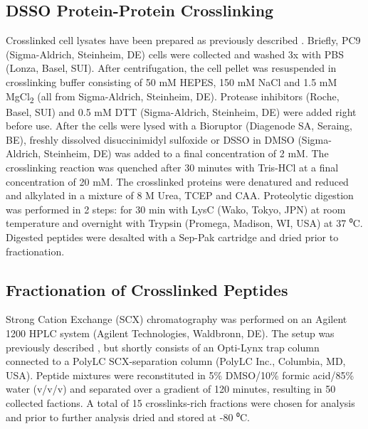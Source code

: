 \subsection{DSSO Protein-Protein Crosslinking}
Crosslinked cell lysates have been prepared as previously described \cite{klykov2018efficient}. Briefly, PC9 (Sigma-Aldrich, Steinheim, DE) cells were collected and washed 3x with PBS (Lonza, Basel, SUI). After centrifugation, the cell pellet was resuspended in crosslinking buffer consisting of 50 mM HEPES, 150 mM NaCl and 1.5 mM MgCl\textsubscript{2} (all from Sigma-Aldrich, Steinheim, DE). Protease inhibitors (Roche, Basel, SUI) and 0.5 mM DTT (Sigma-Aldrich, Steinheim, DE) were added right before use. After the cells were lysed with a Bioruptor (Diagenode SA, Seraing, BE), freshly dissolved disuccinimidyl sulfoxide or DSSO in DMSO (Sigma-Aldrich, Steinheim, DE) was added to a final concentration of 2 mM. The crosslinking reaction was quenched after 30 minutes with Tris-HCl at a final concentration of 20 mM. The crosslinked proteins were denatured and reduced and alkylated in a mixture of 8 M Urea, TCEP and CAA. Proteolytic digestion was performed in 2 steps: for 30 min with LysC (Wako, Tokyo, JPN) at room temperature and overnight with Trypsin (Promega, Madison, WI, USA) at 37 ⁰C. Digested peptides were desalted with a Sep-Pak cartridge and dried prior to fractionation.


\subsection{Fractionation of Crosslinked Peptides}
Strong Cation Exchange (SCX) chromatography was performed on an Agilent 1200 HPLC system (Agilent Technologies, Waldbronn, DE). The setup was previously described \cite{hennrich2011improving}, but shortly consists of an Opti-Lynx trap column connected to a PolyLC SCX-separation column (PolyLC Inc., Columbia, MD, USA). Peptide mixtures were reconstituted in 5\% DMSO/10\% formic acid/85\% water (v/v/v) and separated over a gradient of 120 minutes, resulting in 50 collected factions. A total of 15 crosslinks-rich fractions were chosen for analysis and prior to further analysis dried and stored at -80 ⁰C.



